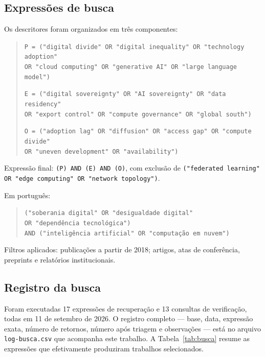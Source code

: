 \documentclass[12pt,a4paper]{article}
\begin{document}
\subsection{Expressões de busca}

Os descritores foram organizados em três componentes:

\begin{quote}
\footnotesize
\texttt{P = ("digital divide" OR "digital inequality" OR "technology adoption"\\
\phantom{P = (}OR "cloud computing" OR "generative AI" OR "large language model")}

\vspace{0.4em}
\texttt{E = ("digital sovereignty" OR "AI sovereignty" OR "data residency"\\
\phantom{E = (}OR "export control" OR "compute governance" OR "global south")}

\vspace{0.4em}
\texttt{O = ("adoption lag" OR "diffusion" OR "access gap" OR "compute divide"\\
\phantom{O = (}OR "uneven development" OR "availability")}
\end{quote}

\noindent Expressão final: \texttt{(P) AND (E) AND (O)}, com exclusão de
\texttt{("federated learning" OR "edge computing" OR "network topology")}.

\noindent Em português:
\begin{quote}
\footnotesize
\texttt{("soberania digital" OR "desigualdade digital"\\
\phantom{(}OR "dependência tecnológica")\\
AND ("inteligência artificial" OR "computação em nuvem")}
\end{quote}

\noindent Filtros aplicados: publicações a partir de 2018; artigos, atas de
conferência, preprints e relatórios institucionais.

\subsection{Registro da busca}

Foram executadas 17 expressões de recuperação e 13 consultas de verificação, todas em
11 de setembro de 2026. O registro completo --- base, data, expressão exata, número de
retornos, número após triagem e observações --- está no arquivo \texttt{log-busca.csv}
que acompanha este trabalho. A Tabela~\ref{tab:busca} resume as expressões que
efetivamente produziram trabalhos selecionados.
\end{document}
